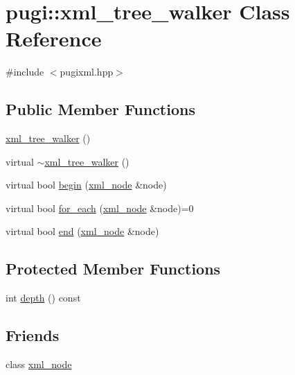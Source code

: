 \hypertarget{classpugi_1_1xml__tree__walker}{\section{pugi\-:\-:xml\-\_\-tree\-\_\-walker Class Reference}
\label{classpugi_1_1xml__tree__walker}
}


{\ttfamily \#include $<$pugixml.\-hpp$>$}

\subsection*{Public Member Functions}
\begin{DoxyCompactItemize}
\item 
\hyperlink{classpugi_1_1xml__tree__walker_a9624dca15f5782ad7d8d78a27c3be805}{xml\-\_\-tree\-\_\-walker} ()
\item 
virtual \hyperlink{classpugi_1_1xml__tree__walker_ad42de75c8c8b07bc871e4072d838ddfb}{$\sim$xml\-\_\-tree\-\_\-walker} ()
\item 
virtual bool \hyperlink{classpugi_1_1xml__tree__walker_a831cc2fc61a47e23673c85efc41bc7a2}{begin} (\hyperlink{classpugi_1_1xml__node}{xml\-\_\-node} \&node)
\item 
virtual bool \hyperlink{classpugi_1_1xml__tree__walker_a309363c9d17ef3fc8cacc6f71fcbea88}{for\-\_\-each} (\hyperlink{classpugi_1_1xml__node}{xml\-\_\-node} \&node)=0
\item 
virtual bool \hyperlink{classpugi_1_1xml__tree__walker_a24e6ffd4a8351e2ee486440b6f784091}{end} (\hyperlink{classpugi_1_1xml__node}{xml\-\_\-node} \&node)
\end{DoxyCompactItemize}
\subsection*{Protected Member Functions}
\begin{DoxyCompactItemize}
\item 
int \hyperlink{classpugi_1_1xml__tree__walker_acb27ca9fea177b0741f29274cb0c805a}{depth} () const 
\end{DoxyCompactItemize}
\subsection*{Friends}
\begin{DoxyCompactItemize}
\item 
class \hyperlink{classpugi_1_1xml__tree__walker_a156d917a92815c7b593bd5ef19f6d5fb}{xml\-\_\-node}
\end{DoxyCompactItemize}


